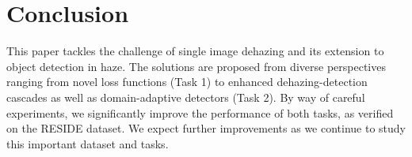 \documentclass[10pt,twocolumn,letterpaper]{article}
\begin{document}




\section{Conclusion}
This paper tackles the challenge of single image dehazing and its extension to object detection in haze. The solutions are proposed from diverse perspectives ranging from novel loss functions (Task 1) to enhanced dehazing-detection cascades as well as domain-adaptive detectors (Task 2). By way of careful experiments, we significantly improve the performance of both tasks, as verified on the RESIDE dataset. We expect further improvements as we continue to study this important dataset and tasks.
\end{document}
